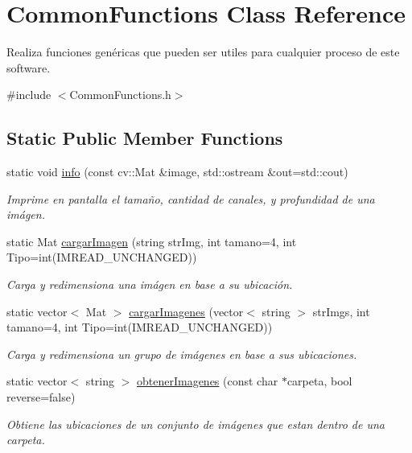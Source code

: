 \hypertarget{classCommonFunctions}{}\section{Common\+Functions Class Reference}
\label{classCommonFunctions}


Realiza funciones genéricas que pueden ser utiles para cualquier proceso de este software.  




{\ttfamily \#include $<$Common\+Functions.\+h$>$}

\subsection*{Static Public Member Functions}
\begin{DoxyCompactItemize}
\item 
static void \mbox{\hyperlink{classCommonFunctions_a51a3e18bdcc2c918ebc81f0cc1f47851}{info}} (const cv\+::\+Mat \&image, std\+::ostream \&out=std\+::cout)
\begin{DoxyCompactList}\small\item\em Imprime en pantalla el tamaño, cantidad de canales, y profundidad de una imágen. \end{DoxyCompactList}\item 
static Mat \mbox{\hyperlink{classCommonFunctions_afd243765a93b61f26d97467a72838ff9}{cargar\+Imagen}} (string str\+Img, int tamano=4, int Tipo=int(I\+M\+R\+E\+A\+D\+\_\+\+U\+N\+C\+H\+A\+N\+G\+ED))
\begin{DoxyCompactList}\small\item\em Carga y redimensiona una imágen en base a su ubicación. \end{DoxyCompactList}\item 
static vector$<$ Mat $>$ \mbox{\hyperlink{classCommonFunctions_a35ffddd0b411b9a87e40743236827569}{cargar\+Imagenes}} (vector$<$ string $>$ str\+Imgs, int tamano=4, int Tipo=int(I\+M\+R\+E\+A\+D\+\_\+\+U\+N\+C\+H\+A\+N\+G\+ED))
\begin{DoxyCompactList}\small\item\em Carga y redimensiona un grupo de imágenes en base a sus ubicaciones. \end{DoxyCompactList}\item 
static vector$<$ string $>$ \mbox{\hyperlink{classCommonFunctions_a79ab98672a5297e53ea032a9ecf7ec02}{obtener\+Imagenes}} (const char $\ast$carpeta, bool reverse=false)
\begin{DoxyCompactList}\small\item\em Obtiene las ubicaciones de un conjunto de imágenes que estan dentro de una carpeta. \end{DoxyCompactList}\item 

\end{DoxyCompactItemize}

